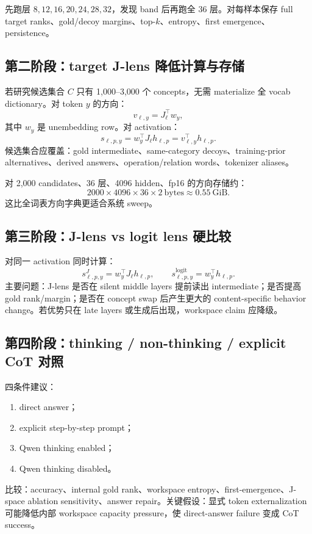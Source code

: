\documentclass[10.5pt,a4paper]{ctexart}
\begin{document}
先跑层 \(8,12,16,20,24,28,32\)，发现 band 后再跑全 36 层。对每样本保存 full target ranks、gold/decoy margins、top-$k$、entropy、first emergence、persistence。

\subsection{第二阶段：target J-lens 降低计算与存储}
若研究候选集合 $C$ 只有 1,000--3,000 个 concepts，无需 materialize 全 vocab dictionary。对 token $y$ 的方向：
\[
v_{\ell,y}=J_\ell^\top w_y,
\]
其中 $w_y$ 是 unembedding row。对 activation：
\[
s_{\ell,p,y}=w_y^\top J_\ell h_{\ell,p}=v_{\ell,y}^\top h_{\ell,p}.
\]
候选集合应覆盖：gold intermediate、same-category decoys、training-prior alternatives、derived answers、operation/relation words、tokenizer aliases。

对 2,000 candidates、36 层、4096 hidden、fp16 的方向存储约：
\[
2000\times4096\times36\times2\ \mathrm{bytes}
\approx0.55\ \mathrm{GiB}.
\]
这比全词表方向字典更适合系统 sweep。

\subsection{第三阶段：J-lens vs logit lens 硬比较}
对同一 activation 同时计算：
\[
s^{J}_{\ell,p,y}=w_y^\top J_\ell h_{\ell,p},
\qquad
s^{\mathrm{logit}}_{\ell,p,y}=w_y^\top h_{\ell,p}.
\]
主要问题：J-lens 是否在 silent middle layers 提前读出 intermediate；是否提高 gold rank/margin；是否在 concept swap 后产生更大的 content-specific behavior change。若优势只在 late layers 或生成后出现，workspace claim 应降级。

\subsection{第四阶段：thinking / non-thinking / explicit CoT 对照}
四条件建议：
\begin{enumerate}
  \item direct answer；
  \item explicit step-by-step prompt；
  \item Qwen thinking enabled；
  \item Qwen thinking disabled。
\end{enumerate}
比较：accuracy、internal gold rank、workspace entropy、first-emergence、J-space ablation sensitivity、answer repair。关键假设：显式 token externalization 可能降低内部 workspace capacity pressure，使 direct-answer failure 变成 CoT success。
\end{document}
